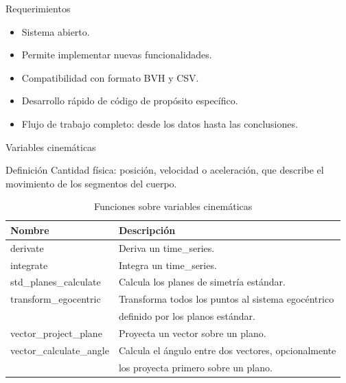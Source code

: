 \documentclass[aspectratio=169,spanish]{beamer} %
\newcommand{\mono}[1]{{\ttfamily #1}}
\begin{document}
\begin{frame}{Requerimientos}
    \begin{itemize}
        \item Sistema abierto.
        \item Permite implementar nuevas funcionalidades.
        \item Compatibilidad con formato BVH y CSV.
        \item Desarrollo rápido de código de propósito específico.
        \item Flujo de trabajo completo: desde los datos hasta las conclusiones. 
    \end{itemize}
\end{frame}

\begin{frame}{Variables cinemáticas}
    \begin{block}{Definición}
        Cantidad física: posición, velocidad o aceleración, que describe el movimiento de los segmentos del cuerpo.
    \end{block}
\begin{table}
    \centering
    \caption{Funciones sobre variables cinemáticas}
    \label{tab:kinematics}
    \scriptsize
    \begin{tabular}{ll}
        \toprule
        Nombre & Descripción \\
        \midrule
        \mono{derivate} & Deriva un \mono{time\_series}. \\
        \mono{integrate} & Integra un \mono{time\_series}. \\
        \mono{std\_planes\_calculate} & Calcula los planes de simetría estándar. \\
        \mono{transform\_egocentric} & Transforma todos los puntos al sistema egocéntrico \\ & definido por los planos estándar. \\
        \mono{vector\_project\_plane} & Proyecta un vector sobre un plano. \\
        \mono{vector\_calculate\_angle} & Calcula el ángulo entre dos vectores, opcionalmente \\ & los proyecta primero sobre un plano. \\
        \bottomrule
    \end{tabular}
\end{table}
\end{frame}
\end{document}
